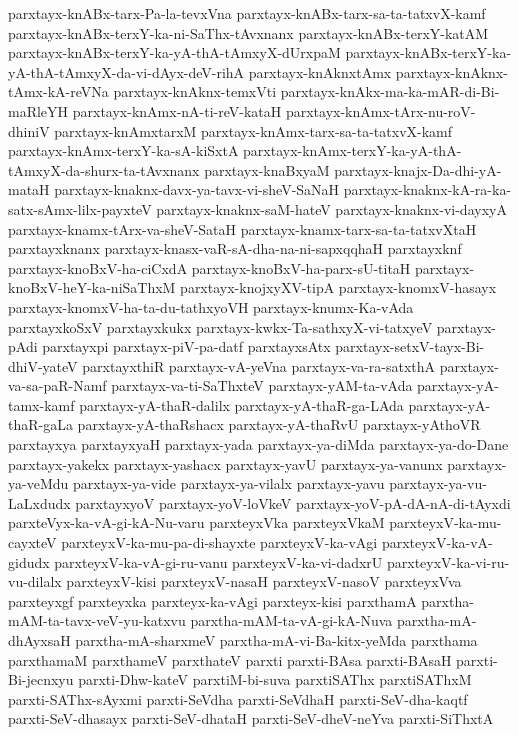 {parxtayx-knABx-tarx-Pa-la-tevxVna
parxtayx-knABx-tarx-sa-ta-tatxvX-kamf
parxtayx-knABx-terxY-ka-ni-SaThx-tAvxnanx
parxtayx-knABx-terxY-katAM
parxtayx-knABx-terxY-ka-yA-thA-tAmxyX-dUrxpaM
parxtayx-knABx-terxY-ka-yA-thA-tAmxyX-da-vi-dAyx-deV-rihA
parxtayx-knAknxtAmx
parxtayx-knAknx-tAmx-kA-reVNa
parxtayx-knAknx-temxVti
parxtayx-knAkx-ma-ka-mAR-di-Bi-maRleYH
parxtayx-knAmx-nA-ti-reV-kataH
parxtayx-knAmx-tArx-nu-roV-dhiniV
parxtayx-knAmxtarxM
parxtayx-knAmx-tarx-sa-ta-tatxvX-kamf
parxtayx-knAmx-terxY-ka-sA-kiSxtA
parxtayx-knAmx-terxY-ka-yA-thA-tAmxyX-da-shurx-ta-tAvxnanx
parxtayx-knaBxyaM
parxtayx-knajx-Da-dhi-yA-mataH
parxtayx-knaknx-davx-ya-tavx-vi-sheV-SaNaH
parxtayx-knaknx-kA-ra-ka-satx-sAmx-lilx-payxteV
parxtayx-knaknx-saM-hateV
parxtayx-knaknx-vi-dayxyA
parxtayx-knamx-tArx-va-sheV-SataH
parxtayx-knamx-tarx-sa-ta-tatxvXtaH
parxtayxknanx
parxtayx-knasx-vaR-sA-dha-na-ni-sapxqqhaH
parxtayxknf
parxtayx-knoBxV-ha-ciCxdA
parxtayx-knoBxV-ha-parx-sU-titaH
parxtayx-knoBxV-heY-ka-niSaThxM
parxtayx-knojxyXV-tipA
parxtayx-knomxV-hasayx
parxtayx-knomxV-ha-ta-du-tathxyoVH
parxtayx-knumx-Ka-vAda
parxtayxkoSxV
parxtayxkukx
parxtayx-kwkx-Ta-sathxyX-vi-tatxyeV
parxtayx-pAdi
parxtayxpi
parxtayx-piV-pa-datf
parxtayxsAtx
parxtayx-setxV-tayx-Bi-dhiV-yateV
parxtayxthiR
parxtayx-vA-yeVna
parxtayx-va-ra-satxthA
parxtayx-va-sa-paR-Namf
parxtayx-va-ti-SaThxteV
parxtayx-yAM-ta-vAda
parxtayx-yA-tamx-kamf
parxtayx-yA-thaR-dalilx
parxtayx-yA-thaR-ga-LAda
parxtayx-yA-thaR-gaLa
parxtayx-yA-thaRshacx
parxtayx-yA-thaRvU
parxtayx-yAthoVR
parxtayxya
parxtayxyaH
parxtayx-yada
parxtayx-ya-diMda
parxtayx-ya-do-Dane
parxtayx-yakekx
parxtayx-yashacx
parxtayx-yavU
parxtayx-ya-vanunx
parxtayx-ya-veMdu
parxtayx-ya-vide
parxtayx-ya-vilalx
parxtayx-yavu
parxtayx-ya-vu-LaLxdudx
parxtayxyoV
parxtayx-yoV-loVkeV
parxtayx-yoV-pA-dA-nA-di-tAyxdi
parxteVyx-ka-vA-gi-kA-Nu-varu
parxteyxVka
parxteyxVkaM
parxteyxV-ka-mu-cayxteV
parxteyxV-ka-mu-pa-di-shayxte
parxteyxV-ka-vAgi
parxteyxV-ka-vA-gidudx
parxteyxV-ka-vA-gi-ru-vanu
parxteyxV-ka-vi-dadxrU
parxteyxV-ka-vi-ru-vu-dilalx
parxteyxV-kisi
parxteyxV-nasaH
parxteyxV-nasoV
parxteyxVva
parxteyxgf
parxteyxka
parxteyx-ka-vAgi
parxteyx-kisi
parxthamA
parxtha-mAM-ta-tavx-veV-yu-katxvu
parxtha-mAM-ta-vA-gi-kA-Nuva
parxtha-mA-dhAyxsaH
parxtha-mA-sharxmeV
parxtha-mA-vi-Ba-kitx-yeMda
parxthama
parxthamaM
parxthameV
parxthateV
parxti
parxti-BAsa
parxti-BAsaH
parxti-Bi-jecnxyu
parxti-Dhw-kateV
parxtiM-bi-suva
parxtiSAThx
parxtiSAThxM
parxti-SAThx-sAyxmi
parxti-SeVdha
parxti-SeVdhaH
parxti-SeV-dha-kaqtf
parxti-SeV-dhasayx
parxti-SeV-dhataH
parxti-SeV-dheV-neYva
parxti-SiThxtA
}
